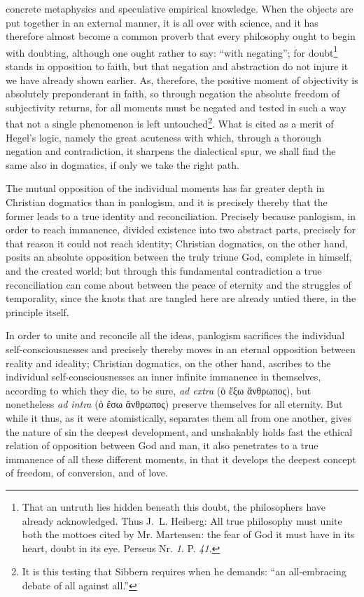 \documentclass[12pt]{book}
\newcommand{\opage}[1]{\marginnote{\footnotesize\textit{[#1]}}}
\begin{document}
concrete metaphysics and speculative empirical knowledge. When the objects are
put together in an external manner, it is all over with science, and it has
therefore almost become a common proverb that every philosophy ought to begin
with doubting, although one ought rather to say: ``with negating''; for
doubt\footnote{That an untruth lies hidden beneath this doubt, the philosophers
have already acknowledged. Thus J.~L. Heiberg: All true philosophy must unite both
the mottoes cited by Mr. Martensen: the fear of God it must have in its heart,
doubt in its eye. Perseus Nr. \textit{1}. P. \textit{41}.} stands in opposition
\opage{147} \setcounter{footnote}{0}%
to faith, but that negation and abstraction do not injure it we have already
shown earlier. As, therefore, the positive moment of objectivity is absolutely
preponderant in faith, so through negation the absolute freedom of subjectivity
returns, for all moments must be negated and tested in such a way that not a
single phenomenon is left untouched\footnote{It is this testing that Sibbern
requires when he demands: ``an all-embracing debate of all against all.''}. What
is cited as a merit of Hegel's logic, namely the great acuteness with which,
through a thorough negation and contradiction, it sharpens the dialectical spur,
we shall find the same also in dogmatics, if only we take the right path.

The mutual opposition of the individual moments has far greater depth in
Christian dogmatics than in panlogism, and it is precisely thereby that the
former leads to a true identity and reconciliation. Precisely because panlogism,
in order to reach immanence, divided existence into two abstract parts, precisely
for that reason it could not reach identity; Christian dogmatics, on the other
hand, posits an absolute opposition between the truly triune God, complete in
himself, and the created world; but through this fundamental contradiction a true
reconciliation can come about between the peace of eternity and the struggles of
temporality, since the knots that are tangled here are already untied there, in
the principle itself.

In order to unite and reconcile all the ideas, panlogism sacrifices the
individual self-consciousnesses and precisely thereby moves in an eternal
opposition between reality and ideality; Christian dogmatics, on the other hand,
ascribes to the individual self-consciousnesses
\opage{148} an inner infinite immanence in themselves, according to which they
die, to be sure, \textit{ad extra} (ὁ ἔξω ἄνθρωπος), but nonetheless \textit{ad
intra} (ὁ ἔσω ἄνθρωπος) preserve themselves for all eternity. But while it thus,
as it were atomistically, separates them all from one another, gives the nature
of sin the deepest development, and unshakably holds fast the ethical relation of
opposition between God and man, it also penetrates to a true immanence of all
these different moments, in that it develops the deepest concept of freedom, of
conversion, and of love.
\end{document}
